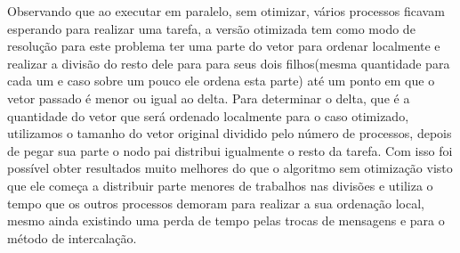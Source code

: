 \documentclass[9pt]{IEEEtran}
\begin{document}
	\begin{table}[H]
		\centering
		\caption{Resultados obtidos para 1000000}
		\label{result_table}
	\end{table}

	Observando que ao executar em paralelo, sem otimizar, vários processos
	ficavam esperando para realizar uma tarefa, a versão otimizada tem como modo
	de resolução para este problema ter uma parte do vetor para ordenar
	localmente e realizar a divisão do resto dele para para seus dois
	filhos(mesma quantidade para cada um e caso sobre um pouco ele ordena esta
	parte) até um ponto em que o vetor passado é menor ou igual ao delta. Para
	determinar o delta, que é a quantidade do vetor que será ordenado localmente
	para o caso otimizado, utilizamos o tamanho do vetor original dividido pelo
	número de processos, depois de pegar sua parte o nodo pai distribui
	igualmente o resto da tarefa. Com isso foi possível obter resultados muito
	melhores do que o algoritmo sem otimização visto que ele começa a distribuir
	parte menores de trabalhos nas divisões e utiliza o tempo que os outros
	processos  demoram para realizar a sua ordenação local, mesmo ainda
	existindo uma perda de tempo pelas trocas de mensagens e para o método de
	intercalação.
\end{document}

